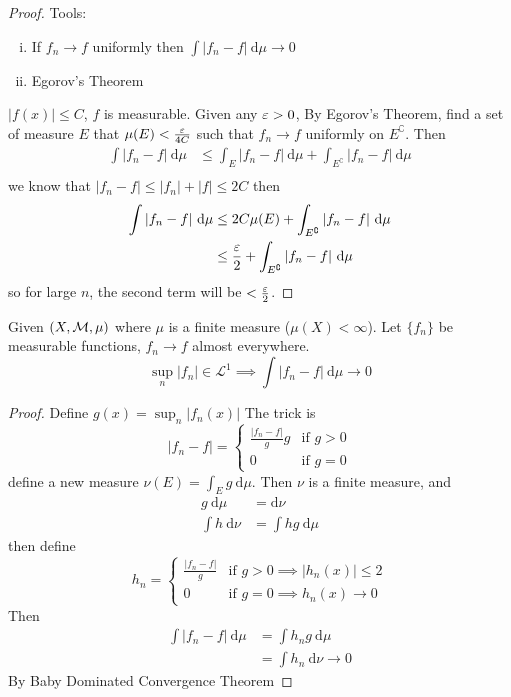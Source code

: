 \begin{proof}
  Tools:
  \begin{enumerate}[(i)]
    \item If $f_n \to f$ uniformly then $\int |f_n-f| \ \mathrm{d}\mu \to 0$
    \item Egorov's Theorem
  \end{enumerate}
  $|f(x)| \le C$, $f$ is measurable.
  Given any $\varepsilon > 0$, By Egorov's Theorem, find a set of measure $E$ that $\mu(E) < \frac{\varepsilon}{4C}$ 
  such that $f_n \to f$ uniformly on $E^\complement$.
  Then
  \begin{align*}
    \int |f_n - f| \ \mathrm{d}\mu &\le \int_E |f_n - f| \ \mathrm{d}\mu + \int_{E^\complement} |f_n - f| \ \mathrm{d}\mu  \\
  \end{align*}
  we know that $|f_n - f| \le |f_n| + |f| \le 2C$ then
  \begin{align*}
    \int |f_n - f| \ \mathrm{d}\mu &\le 2C\mu(E) + \int_{E^\complement} |f_n - f| \ \mathrm{d}\mu  \\
    &\le \frac{\eps}{2} + \int_{E^\complement} |f_n - f| \ \mathrm{d}\mu  \\ 
  \end{align*}
  so for large $n$, the second term will be $< \frac{\varepsilon}{2}$.
\end{proof}

\begin{theorem}
  Given $(X, \mathcal M, \mu)$ where $\mu$ is a finite measure ($\mu(X) < \infty$).
  Let $\{f_n\}$ be measurable functions, $f_n \to f$ almost everywhere.
  \[\sup_n|f_n| \in \mathcal{L}^1 \implies \int |f_n - f| \ \mathrm{d}\mu \to 0\]
\end{theorem}

\begin{proof}
  Define $g(x) = \sup_n |f_n(x)|$ 
  The trick is $$|f_n - f| =\begin{cases}
     \frac{|f_n-f|}{g}g & \text{if } g > 0 \\
     0 & \text{if } g = 0
  \end{cases}$$
  define a new measure $\nu(E) = \int_E g \ \mathrm{d}\mu$.
  Then $\nu$ is a finite measure, and 
  \begin{align*}
    g\ \mathrm{d}\mu &= \mathrm{d}\nu \\
    \int h \ \mathrm{d}\nu &= \int hg \ \mathrm{d}\mu
  \end{align*}
  then define
  $$h_n = \begin{cases}
    \frac{|f_n - f|}{g} & \text{if } g > 0 \implies |h_n(x)| \le 2\\
    0 & \text{if } g = 0 \implies h_n(x) \to 0
  \end{cases}$$
  Then\begin{align*}
    \int |f_n - f| \ \mathrm{d}\mu &= \int h_n g \ \mathrm{d}\mu \\
    &= \int h_n \ \mathrm{d}\nu \to 0
  \end{align*}
  By Baby Dominated Convergence Theorem
\end{proof}

